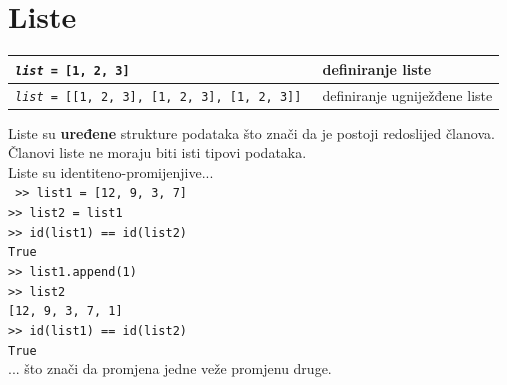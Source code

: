\documentclass[10pt]{article}
\begin{document}
    \section*{\color{NavyBlue} Liste}
    \begin{tabular}{|>{\tt}p{9.00cm}|>{}p{15.50cm}|}
        \hline
        \textit{list} = [1, 2, 3] & definiranje liste
        \\ \hline
        \textit{list} = [[1, 2, 3], [1, 2, 3], [1, 2, 3]] & definiranje ugniježđene liste
        \\ \hline
    \end{tabular}
    \begin{center}
        \footnotesize
        Liste su \textbf{uređene} strukture podataka što znači da je postoji redoslijed članova. \\
        Članovi liste ne moraju biti isti tipovi podataka. \\
        Liste su identiteno-promijenjive... \\
        \texttt{
            >> list1 = [12, 9, 3, 7] \\
            >> list2 = list1 \\
            >> id(list1) == id(list2) \\
            True \\
            >> list1.append(1) \\
            >> list2 \\
            {[12, 9, 3, 7, 1]} \\
            >> id(list1) == id(list2) \\
            True
        } \\
        ... što znači da promjena jedne veže promjenu druge.
    \end{center}
\end{document}
